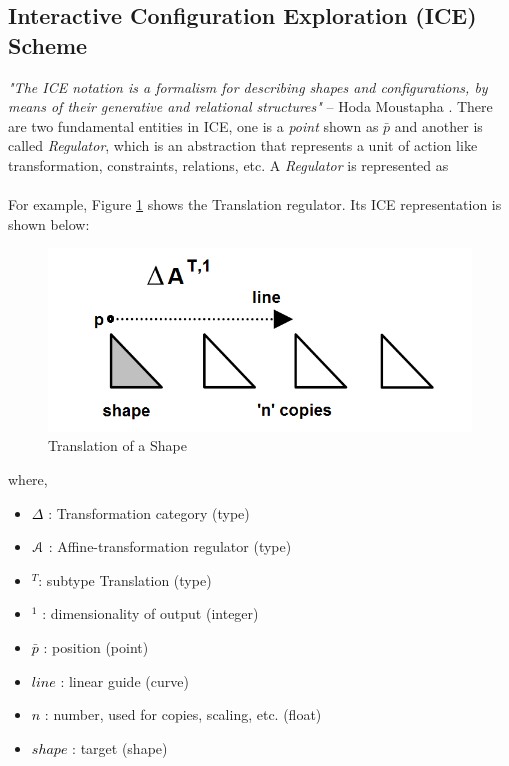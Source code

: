 \subsection{Interactive Configuration Exploration (ICE) Scheme} \label{sec:abstraction:ice}

{\em "The ICE notation is a formalism for describing shapes and  configurations,  by  means  of  their  generative  and  relational  structures"} -- Hoda Moustapha \cite{Hoda2005}.  There are two fundamental entities in ICE, one is a {\em point} shown as $\bar{p}$ and another is called {\em Regulator}, which is an abstraction that represents a unit of action like transformation, constraints, relations, etc. A {\em Regulator} is represented as \\



{}\\

	 For example, Figure \ref{fig:abstraction:hodatranslate} shows the Translation regulator. Its ICE representation is shown below:

	
\begin{figure}[!h]
\centering \includegraphics[width=0.5\linewidth]{images/hodatranslate} 
\caption{Translation of a Shape}
\label{fig:abstraction:hodatranslate}
\end{figure}

	
	where,
		\begin{itemize}[noitemsep,topsep=0pt,parsep=0pt,partopsep=0pt]
		\item 	\textcolor{black}{$\Delta$} : Transformation category (type)
	     	\item 	\textcolor{black}{${\bf \mathcal{A}}$} : Affine-transformation regulator (type)
		\item  	\textcolor{black}{$^T$}: subtype Translation (type)
		 \item 	\textcolor{black}{$^1$} : dimensionality of output (integer)
	        \item 	\textcolor{black}{ $\bar{p}$} : position (point)
  		\item  	\textcolor{black}{$line$} : linear guide (curve)
		 \item  	\textcolor{black}{$n$} : number, used for copies, scaling, etc. (float)
		 \item  	\textcolor{black}{$shape$} : target (shape)
		\end{itemize}

